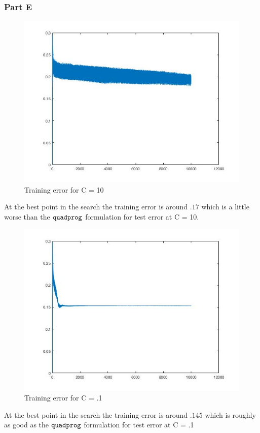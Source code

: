 \documentclass[11pt, oneside]{article}   	%
\begin{document}
\newpage{}
\subsubsection{Part E}
\begin{figure}[h!]
  \includegraphics[width=\linewidth]{training_loss_10.jpg}
  \caption{Training error for C = 10}
\end{figure}
At the best point in the search the training error is around $.17$ which is a little worse than the $\verb!quadprog!$ formulation for test error at C = 10.

\newpage{}
\begin{figure}[h!]
  \includegraphics[width=\linewidth]{training_loss_01.jpg}
  \caption{Training error for C = .1}
\end{figure}
At the best point in the search the training error is around $.145$ which is roughly as good as the $\verb!quadprog!$ formulation for test error at C = .1
\end{document}
